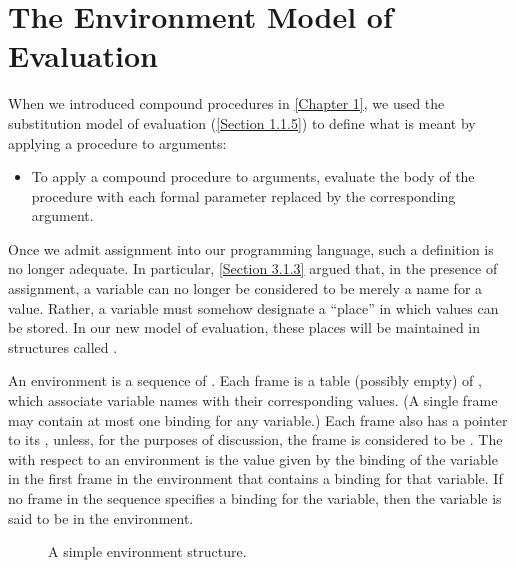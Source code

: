 \section{The Environment Model of Evaluation}
\label{Section 3.2}

When we introduced compound procedures in \cref{Chapter 1}, we used the substitution model of evaluation (\cref{Section 1.1.5}) to define what is meant by applying a procedure to arguments:
\begin{itemize}

	\item
		To apply a compound procedure to arguments, evaluate the body of the procedure with each formal parameter replaced by the corresponding argument.

\end{itemize}

Once we admit assignment into our programming language, such a definition is no longer adequate.
In particular, \cref{Section 3.1.3} argued that, in the presence of assignment, a variable can no longer be considered to be merely a name for a value.
Rather, a variable must somehow designate a “place” in which values can be stored.
In our new model of evaluation, these places will be maintained in structures called .

An environment is a sequence of .
Each frame is a table (possibly empty) of , which associate variable names with their corresponding values.
(A single frame may contain at most one binding for any variable.)
Each frame also has a pointer to its , unless, for the purposes of discussion, the frame is considered to be .
The  with respect to an environment is the value given by the binding of the variable in the first frame in the environment that contains a binding for that variable.
If no frame in the sequence specifies a binding for the variable, then the variable is said to be  in the environment.

\begin{figure}[tb]
	\centering
	
	\caption{A simple environment structure.}
	\label{Figure 3.1}
\end{figure}

